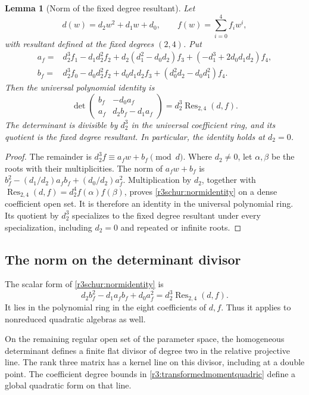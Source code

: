 \documentclass[11pt,a4paper]{article}
\numberwithin{equation}{section}
\theoremstyle{plain}
\newtheorem{lemma}[theorem]{Lemma}
\theoremstyle{definition}
\theoremstyle{remark}
\begin{document}
\begin{lemma}[Norm of the fixed degree resultant]
\label{r3schur:norm}
Let
\[
 d(w)=d_2w^2+d_1w+d_0,\qquad f(w)=\sum_{i=0}^{4}f_iw^i,
\]
with resultant defined at the fixed degrees $(2,4)$.
Put
\begin{align*}
 a_f={}&d_2^3f_1-d_1d_2^2f_2+d_2(d_1^2-d_0d_2)f_3
                   +(-d_1^3+2d_0d_1d_2)f_4,\\
 b_f={}&d_2^3f_0-d_0d_2^2f_2+d_0d_1d_2f_3
                   +(d_0^2d_2-d_0d_1^2)f_4.
\end{align*}
Then the universal polynomial identity is
\begin{equation}
 \det\begin{pmatrix} b_f&-d_0 a_f\\
                      a_f&d_2 b_f-d_1 a_f\end{pmatrix}
 =d_2^3\operatorname{Res}_{2,4}(d,f).
 \label{r3schur:normidentity}
\end{equation}
The determinant is divisible by $d_2^3$ in the universal coefficient
ring, and its quotient is the fixed degree resultant.
In particular, the identity holds at $d_2=0$.
\end{lemma}
\begin{proof}
The remainder is $d_2^3f\equiv a_fw+b_f\pmod d$.
Where $d_2\ne0$, let $\alpha,\beta$ be the roots with their
multiplicities. The norm of $a_fw+b_f$ is
$b_f^2-(d_1/d_2)a_fb_f+(d_0/d_2)a_f^2$.
Multiplication by $d_2$, together with
$\operatorname{Res}_{2,4}(d,f)=d_2^4f(\alpha)f(\beta)$,
proves \eqref{r3schur:normidentity} on a dense coefficient open set.
It is therefore an identity in the universal polynomial ring.
Its quotient by $d_2^3$ specializes to the fixed degree resultant
under every specialization, including $d_2=0$ and repeated or
infinite roots.
\end{proof}

\subsection{The norm on the determinant divisor}\label{appr3:norm}

The scalar form of \eqref{r3schur:normidentity} is
\[
 d_2b_f^2-d_1a_fb_f+d_0a_f^2
   =d_2^3\operatorname{Res}_{2,4}(d,f).
\]
It lies in the polynomial ring in the eight coefficients of $d,f$.
Thus it applies to nonreduced quadratic algebras as well.

On the remaining regular open set of the parameter space, the
homogeneous determinant defines a finite flat divisor of degree two
in the relative projective line. The rank three matrix has a kernel
line on this divisor, including at a double point.
The coefficient degree bounds in \eqref{r3:transformedmomentquadric}
define a global quadratic form on that line.
\end{document}
